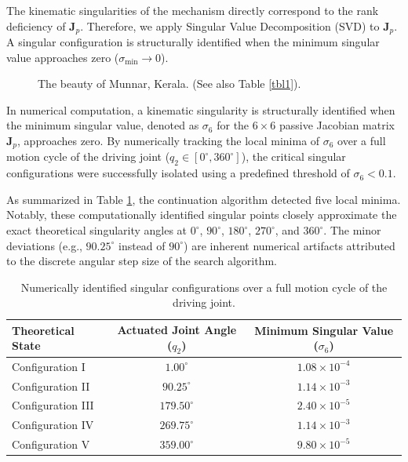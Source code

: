 \documentclass[a4paper,fleqn]{cas-sc}
\begin{document}
The kinematic singularities of the mechanism directly correspond to the rank deficiency of $\mathbf{J}_p$. Therefore, we apply Singular Value Decomposition (SVD) to $\mathbf{J}_p$. A singular configuration is structurally identified when the minimum singular value approaches zero ($\sigma_{\min} \to 0$).

\begin{figure}
	\centering %
	\caption{The beauty of Munnar, Kerala. (See also Table \protect\ref{tbl1}).} %
	\label{FIG:1} %
\end{figure}

In numerical computation, a kinematic singularity is structurally identified when the minimum singular value, denoted as $\sigma_6$ for the $6 \times 6$ passive Jacobian matrix $\mathbf{J}_p$, approaches zero. By numerically tracking the local minima of $\sigma_6$ over a full motion cycle of the driving joint ($q_2 \in [0^\circ, 360^\circ]$), the critical singular configurations were successfully isolated using a predefined threshold of $\sigma_6 < 0.1$. 

As summarized in Table \ref{tab:singularities}, the continuation algorithm detected five local minima. Notably, these computationally identified singular points closely approximate the exact theoretical singularity angles at $0^\circ$, $90^\circ$, $180^\circ$, $270^\circ$, and $360^\circ$. The minor deviations (e.g., $90.25^\circ$ instead of $90^\circ$) are inherent numerical artifacts attributed to the discrete angular step size of the search algorithm.

\begin{table}[htbp]
    \centering
    \caption{Numerically identified singular configurations over a full motion cycle of the driving joint.}
    \label{tab:singularities}
    \begin{tabular}{lcc}
        \toprule
        \textbf{Theoretical State} & \textbf{Actuated Joint Angle ($q_2$)} & \textbf{Minimum Singular Value ($\sigma_6$)} \\
        \midrule
        Configuration I   & $1.00^\circ$   & $1.08 \times 10^{-4}$ \\
        Configuration II  & $90.25^\circ$  & $1.14 \times 10^{-3}$ \\
        Configuration III & $179.50^\circ$ & $2.40 \times 10^{-5}$ \\
        Configuration IV  & $269.75^\circ$ & $1.14 \times 10^{-3}$ \\
        Configuration V   & $359.00^\circ$ & $9.80 \times 10^{-5}$ \\
        \bottomrule
    \end{tabular}
\end{table}
\end{document}
